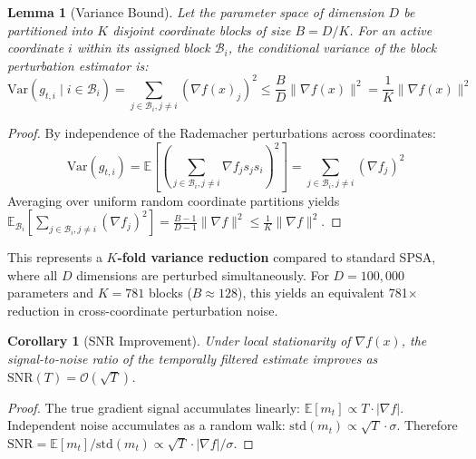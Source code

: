 \documentclass[10pt]{article}
\newtheorem{lemma}[theorem]{Lemma}
\newtheorem{corollary}[theorem]{Corollary}
\begin{document}
\begin{lemma}[Variance Bound]
\label{lem:variance}
Let the parameter space of dimension $D$ be partitioned into $K$ disjoint coordinate blocks of size $B = D/K$. For an active coordinate $i$ within its assigned block $\mathcal{B}_i$, the conditional variance of the block perturbation estimator is:
\begin{equation}
    \text{Var}(g_{t,i} \mid i \in \mathcal{B}_i) = \sum_{j \in \mathcal{B}_i, j \neq i} (\nabla f(x)_j)^2 \leq \frac{B}{D} \|\nabla f(x)\|^2 = \frac{1}{K} \|\nabla f(x)\|^2
\end{equation}
\end{lemma}

\begin{proof}
By independence of the Rademacher perturbations across coordinates:
\begin{equation*}
    \text{Var}(g_{t,i}) = \mathbb{E}\left[\left(\sum_{j \in \mathcal{B}_i, j \neq i} \nabla f_j s_j s_i\right)^2\right] = \sum_{j \in \mathcal{B}_i, j \neq i} (\nabla f_j)^2
\end{equation*}
Averaging over uniform random coordinate partitions yields $\mathbb{E}_{\mathcal{B}_i}\left[\sum_{j \in \mathcal{B}_i, j \neq i} (\nabla f_j)^2\right] = \frac{B-1}{D-1} \|\nabla f\|^2 \leq \frac{1}{K} \|\nabla f\|^2$.
\end{proof}

\noindent This represents a \textbf{$K$-fold variance reduction} compared to standard SPSA, where all $D$ dimensions are perturbed simultaneously. For $D = 100{,}000$ parameters and $K = 781$ blocks ($B \approx 128$), this yields an equivalent 781$\times$ reduction in cross-coordinate perturbation noise.

\begin{corollary}[SNR Improvement]
\label{cor:snr}
Under local stationarity of $\nabla f(x)$, the signal-to-noise ratio of the temporally filtered estimate improves as $\text{SNR}(T) = \mathcal{O}(\sqrt{T})$.
\end{corollary}

\begin{proof}
The true gradient signal accumulates linearly: $\mathbb{E}[m_t] \propto T \cdot |\nabla f|$. Independent noise accumulates as a random walk: $\text{std}(m_t) \propto \sqrt{T} \cdot \sigma$. Therefore $\text{SNR} = \mathbb{E}[m_t] / \text{std}(m_t) \propto \sqrt{T} \cdot |\nabla f| / \sigma$.
\end{proof}

\end{document}
